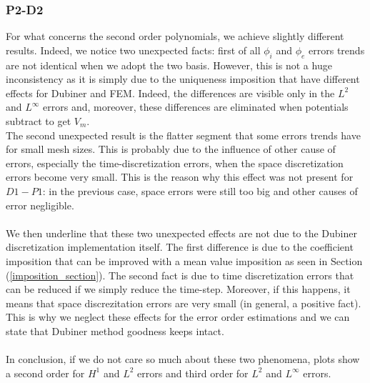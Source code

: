 \documentclass[a4paper,11pt]{article}
\begin{document}
\subsubsection{P2-D2} \label{P2-D2}
\noindent  For what concerns the second order polynomials, we achieve slightly different results. Indeed, we notice two unexpected facts: first of all $\phi_i$ and $\phi_e$ errors trends are not identical when we adopt the two basis. However, this is not a huge inconsistency as it is simply due to the uniqueness imposition that have different effects for Dubiner and FEM. Indeed, the differences are visible only in the $L^2$ and $L^\infty$ errors and, moreover, these differences are eliminated when potentials subtract to get $V_m$. \\
The second unexpected result is the flatter segment that some errors trends have for small mesh sizes. This is probably due to the influence of other cause of errors, especially the time-discretization errors, when the space discretization errors become very small. This is the reason why this effect was not present for $D1-P1$: in the previous case, space errors were still too big and other causes of error negligible. \\ \\
We then underline that these two unexpected effects are not due to the Dubiner discretization implementation itself. The first difference is due to the coefficient imposition that can be improved with a mean value imposition as seen in Section (\ref{imposition_section}). The second fact is due to time discretization errors that can be reduced if we simply reduce the time-step. Moreover, if this happens, it means that space discrezitation errors are very small (in general, a positive fact). This is why we neglect these effects for the error order estimations and we can state that Dubiner method goodness keeps intact. \\ \\
In conclusion, if we do not care so much about these two phenomena, plots show a second order for $H^1$ and $L^2$ errors and third order for $L^2$ and $L^\infty$ errors.
\end{document}
